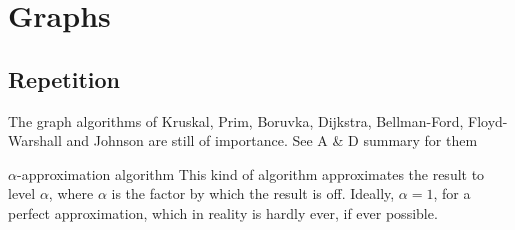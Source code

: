 \newsection
\section{Graphs}

\subsection{Repetition}
The graph algorithms of Kruskal, Prim, Boruvka, Dijkstra, Bellman-Ford, Floyd-Warshall and Johnson are still of importance. See A \& D summary for them

\begin{definition}[]{$\alpha$-approximation algorithm}
    This kind of algorithm approximates the result to level $\alpha$, where $\alpha$ is the factor by which the result is off. Ideally, $\alpha = 1$, for a perfect approximation, which in reality is hardly ever, if ever possible.
\end{definition}
